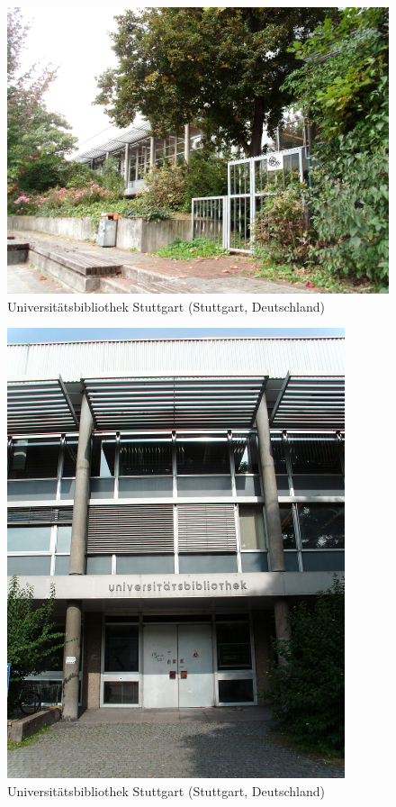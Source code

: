 \documentclass[a4paper,
fontsize=11pt,
oneside,
numbers=noperiodatend,
parskip=half-,
bibliography=totoc,
final
]{scrartcl}
\begin{document}
\begin{figure}[htbp]
\centering
\includegraphics{./img/035.jpg}
\caption{Universitätsbibliothek Stuttgart (Stuttgart,
Deutschland)}
\end{figure}

\begin{figure}[htbp]
\centering
\includegraphics{./img/036.jpg}
\caption{Universitätsbibliothek Stuttgart (Stuttgart,
Deutschland)}
\end{figure}
\end{document}
